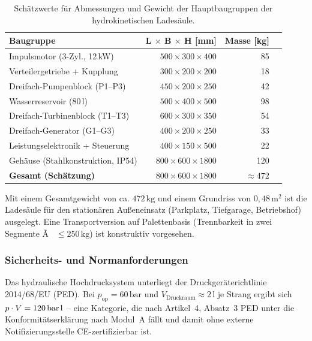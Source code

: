 ﻿\documentclass[a4paper,12pt]{article}
\begin{document}
\begin{table}[htbp]
  \centering
  \caption{Schätzwerte für Abmessungen und Gewicht der Hauptbaugruppen
           der hydrokinetischen Ladesäule.}
  \label{tab:abmessungen}
  \begin{tabular}{lrrr}
    \toprule
    \textbf{Baugruppe} & \textbf{L $\times$ B $\times$ H [mm]} & \textbf{Masse [kg]} \\
    \midrule
    Impulsmotor (3-Zyl., 12\,kW)       & $500 \times 300 \times 400$ & 85 \\
    Verteilergetriebe + Kupplung        & $300 \times 200 \times 200$ & 18 \\
    Dreifach-Pumpenblock (P1--P3)       & $450 \times 200 \times 250$ & 42 \\
    Wasserreservoir (80\,l)             & $500 \times 400 \times 500$ & 98 \\
    Dreifach-Turbinenblock (T1--T3)     & $600 \times 300 \times 350$ & 54 \\
    Dreifach-Generator (G1--G3)         & $400 \times 200 \times 250$ & 33 \\
    Leistungselektronik + Steuerung     & $400 \times 150 \times 500$ & 22 \\
    Gehäuse (Stahlkonstruktion, IP54)   & $800 \times 600 \times 1800$ & 120 \\
    \midrule
    \textbf{Gesamt (Schätzung)}         & $800 \times 600 \times 1800$ & \textbf{$\approx 472$} \\
    \bottomrule
  \end{tabular}
\end{table}

Mit einem Gesamtgewicht von ca. $472\,\text{kg}$ und einem Grundriss von
$0{,}48\,\text{m}^2$ ist die Ladesäule für den stationären Außeneinsatz
(Parkplatz, Tiefgarage, Betriebshof) ausgelegt. Eine Transportversion
auf Palettenbasis (Trennbarkeit in zwei Segmente Ã  $\leq 250\,\text{kg}$)
ist konstruktiv vorgesehen.

\subsubsection{Sicherheits- und Normanforderungen}

Das hydraulische Hochdrucksystem unterliegt der Druckgeräterichtlinie
2014/68/EU (PED). Bei $p_\text{op} = 60\,\text{bar}$ und
$V_\text{Druckraum} \approx 2\,\text{l}$ je Strang ergibt sich
$p \cdot V = 120\,\text{bar\,l}$ -- eine Kategorie, die nach Artikel~4,
Absatz~3 PED unter die Konformitätserklärung nach Modul~A fällt und
damit ohne externe Notifizierungsstelle CE-zertifizierbar ist.
\end{document}
